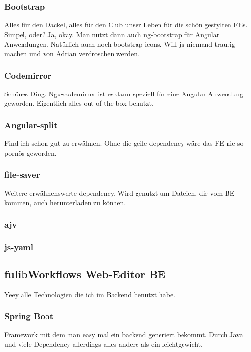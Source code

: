 \subsubsection{Bootstrap}
\todo
Alles für den Dackel, alles für den Club unser Leben für die schön gestylten FEs.
Simpel, oder?
Ja, okay.
Man nutzt dann auch ng-bootstrap für Angular Anwendungen.
Natürlich auch noch bootstrap-icons.
Will ja niemand traurig machen und von Adrian verdroschen werden.

\subsubsection{Codemirror}
\todo
Schönes Ding.
Ngx-codemirror ist es dann speziell für eine Angular Anwendung geworden.
Eigentlich alles out of the box benutzt.

\subsubsection{Angular-split}
\todo
Find ich schon gut zu erwähnen.
Ohne die geile dependency wäre das FE nie so pornös geworden.

\subsubsection{file-saver}
\todo
Weitere erwähnenswerte dependency.
Wird genutzt um Dateien, die vom BE kommen, auch herunterladen zu können.

\subsubsection{ajv}
\todo

\subsubsection{js-yaml}
\todo


\subsection{fulibWorkflows Web-Editor BE}\label{subsubsec:backend}
\todo
Yeey alle Technologien die ich im Backend benutzt habe.

\subsubsection{Spring Boot}
\todo
Framework mit dem man easy mal ein backend generiert bekommt.
Durch Java und viele Dependency allerdings alles andere als ein leichtgewicht.

